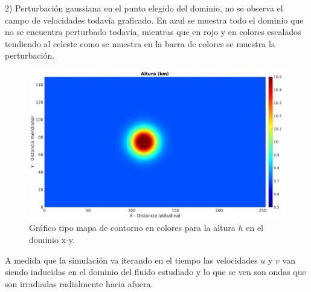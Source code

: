 \documentclass[12pt,dvipsnames]{exam}
\begin{document}
2) Perturbación gaussiana en el punto elegido del dominio, no se observa el campo de velocidades todavía graficado. En azul se muestra todo el dominio que no se encuentra perturbado todavía, mientras que en rojo y en colores escalados tendiendo al celeste como se muestra en la barra de colores se muestra la perturbación.

\begin{figure}[H]
\centering
\includegraphics[scale=0.3]{h0.jpeg}
\caption{Gráfico tipo mapa de contorno en colores para la altura $h$ en el dominio x-y. }
\end{figure}


A medida que la simulación va iterando en el tiempo las velocidades $u$ y $v$ van siendo inducidas en el dominio del fluido estudiado y lo que se ven son ondas que son irradiadas radialmente hacia afuera.%
\end{document}
